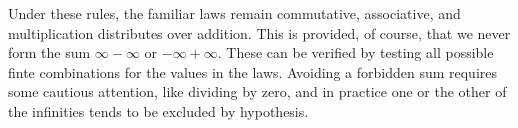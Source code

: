 Under these rules, the familiar laws remain commutative, associative, and multiplication distributes over addition.
This is provided, of course, that we never form the sum $\infty - \infty$ or $-\infty + \infty$.
These can be verified by testing all possible finte combinations for the values in the laws.
Avoiding a forbidden sum requires some cautious attention, like dividing by zero, and in practice one or the other of the infinities tends to be excluded by hypothesis.

\blankpage

